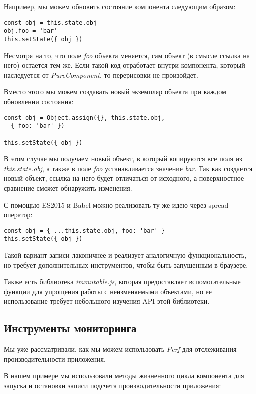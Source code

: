 Например, мы можем обновить состояние компонента следующим образом:

\begin{lstlisting}
const obj = this.state.obj
obj.foo = 'bar'
this.setState({ obj })
\end{lstlisting}

Несмотря на то, что поле \textit{foo} объекта меняется, сам объект (в смысле ссылка на него) остается тем же. Если такой код отработает внутри компонента, который наследуется от \textit{PureComponent}, то перерисовки не произойдет.

Вместо этого мы можем создавать новый экземпляр объекта при каждом обновлении состояния:

\begin{lstlisting}
const obj = Object.assign({}, this.state.obj, 
  { foo: 'bar' })

this.setState({ obj })
\end{lstlisting}

В этом случае мы получаем новый объект, в который копируются все поля из \textit{this.state.obj}, а также в поле \textit{foo} устанавливается значение \textit{bar}. Так как создается новый объект, ссылка на него будет отличаться от исходного, а поверхностное сравнение сможет обнаружить изменения.

С помощью ES2015 и Babel можно реализовать ту же идею через spread оператор: 

\begin{lstlisting}
const obj = { ...this.state.obj, foo: 'bar' }
this.setState({ obj })
\end{lstlisting}

Такой вариант записи лаконичнее и реализует аналогичную функциональность, но требует дополнительных инструментов, чтобы быть запущенным в браузере. 

Также есть библиотека \textit{immutable.js}, которая предоставляет вспомогательные функции для упрощения работы с неизменяемыми объектами, но ее использование требует небольшого изучения API этой библиотеки.

\subsection{Инструменты мониторинга}

Мы уже рассматривали, как мы можем использовать \textit{Perf} для отслеживания производительности приложения.

В нашем примере мы использовали методы жизненного цикла компонента для запуска и остановки записи подсчета производительности приложения:

